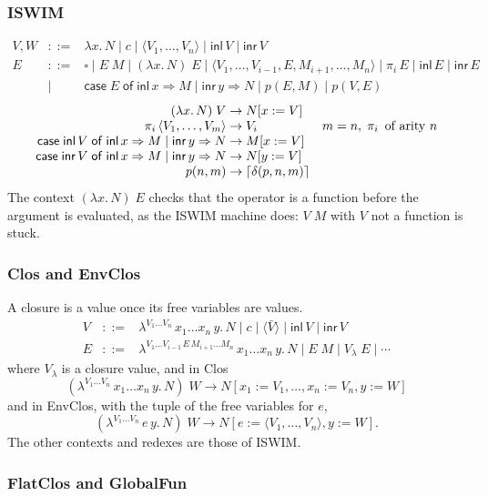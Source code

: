 \documentclass[10pt]{article}
\theoremstyle{acmplain}
\newcommand{\key}[1]{\mathsf{#1}}
\newcommand{\lam}[1]{\lambda #1.\,}
\newcommand{\clos}[2]{\lambda^{#1}\, #2.\,}
\newcommand{\inl}{\key{inl}\,}
\newcommand{\inr}{\key{inr}\,}
\newcommand{\Case}[5]{\key{case}\;#1\;\key{of}\;\key{inl}\,#2 \Rightarrow #3 \mid \key{inr}\,#4 \Rightarrow #5}
\newcommand{\tuple}[1]{\langle #1 \rangle}
\newcommand{\prj}[1]{\pi_{#1}\,}
\newcommand{\prim}[3]{#1(#2, #3)}
\newcommand{\res}[1]{\lceil #1 \rceil}
\begin{document}
\subsubsection{ISWIM}

\[
\begin{array}{rcl}
  V, W &::=& \lam{x} N \mid c \mid \tuple{V_1, \ldots, V_n} \mid \inl V \mid \inr V \\
  E &::=& \square \mid E\;M \mid (\lam{x} N)\;E \mid \tuple{V_1, \ldots, V_{i-1}, E, M_{i+1}, \ldots, M_n}
    \mid \prj{i} E \mid \inl E \mid \inr E \\
  &\mid& \Case{E}{x}{M}{y}{N} \mid \prim{p}{E}{M} \mid \prim{p}{V}{E}
\end{array}
\]
\[
\begin{array}{@{}r@{\;\to\;}l@{\quad}l@{}}
  (\lam{x} N)\;V & N[x := V] \\
  \prj{i} \tuple{V_1, \ldots, V_m} & V_i & m = n,\; \prj{i} \text{ of arity } n \\
  \Case{\inl V}{x}{M}{y}{N} & M[x := V] \\
  \Case{\inr V}{x}{M}{y}{N} & N[y := V] \\
  \prim{p}{n}{m} & \res{\delta(p, n, m)}
\end{array}
\]
The context $(\lam{x} N)\;E$ checks that the operator is a function before
the argument is evaluated, as the ISWIM machine does: $V\;M$ with $V$ not a
function is stuck.

\subsubsection{Clos and EnvClos}

A closure is a value once its free variables are values.
\[
\begin{array}{rcl}
  V &::=& \clos{V_1\ldots V_n}{x_1\ldots x_n\, y} N \mid c \mid \tuple{\bar{V}} \mid \inl V \mid \inr V \\
  E &::=& \clos{V_1 \ldots V_{i-1}\, E\, M_{i+1} \ldots M_n}{x_1\ldots x_n\, y} N \mid E\;M \mid V_\lambda\;E \mid \cdots
\end{array}
\]
where $V_\lambda$ is a closure value, and in Clos
\[
  (\clos{V_1\ldots V_n}{x_1\ldots x_n\, y} N)\;W \to N[x_1 := V_1, \ldots, x_n := V_n, y := W]
\]
and in EnvClos, with the tuple of the free variables for $e$,
\[
  (\clos{V_1\ldots V_n}{e\, y} N)\;W \to N[e := \tuple{V_1, \ldots, V_n}, y := W] .
\]
The other contexts and redexes are those of ISWIM.

\subsubsection{FlatClos and GlobalFun}
\end{document}
